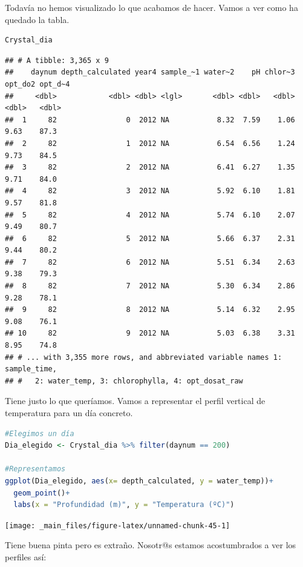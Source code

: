 \documentclass[
]{book}
\begin{document}
Todavía no hemos visualizado lo que acabamos de hacer. Vamos a ver como ha quedado la tabla.

\begin{lstlisting}[language=R]
Crystal_dia
\end{lstlisting}

\begin{lstlisting}
## # A tibble: 3,365 x 9
##    daynum depth_calculated year4 sample_~1 water~2    pH chlor~3 opt_do2 opt_d~4
##     <dbl>            <dbl> <dbl> <lgl>       <dbl> <dbl>   <dbl>   <dbl>   <dbl>
##  1     82                0  2012 NA           8.32  7.59    1.06    9.63    87.3
##  2     82                1  2012 NA           6.54  6.56    1.24    9.73    84.5
##  3     82                2  2012 NA           6.41  6.27    1.35    9.71    84.0
##  4     82                3  2012 NA           5.92  6.10    1.81    9.57    81.8
##  5     82                4  2012 NA           5.74  6.10    2.07    9.49    80.7
##  6     82                5  2012 NA           5.66  6.37    2.31    9.44    80.2
##  7     82                6  2012 NA           5.51  6.34    2.63    9.38    79.3
##  8     82                7  2012 NA           5.30  6.34    2.86    9.28    78.1
##  9     82                8  2012 NA           5.14  6.32    2.95    9.08    76.1
## 10     82                9  2012 NA           5.03  6.38    3.31    8.95    74.8
## # ... with 3,355 more rows, and abbreviated variable names 1: sample_time,
## #   2: water_temp, 3: chlorophylla, 4: opt_dosat_raw
\end{lstlisting}

Tiene justo lo que queríamos. Vamos a representar el perfil vertical de temperatura para un día concreto.

\begin{lstlisting}[language=R]
#Elegimos un día
Dia_elegido <- Crystal_dia %>% filter(daynum == 200)

#Representamos
ggplot(Dia_elegido, aes(x= depth_calculated, y = water_temp))+
  geom_point()+
  labs(x = "Profundidad (m)", y = "Temperatura (ºC)")
\end{lstlisting}

\texttt{[image: \_main\_files/figure-latex/unnamed-chunk-45-1]}

Tiene buena pinta pero es extraño. Nosotr@s estamos acostumbrados a ver los perfiles así:
\end{document}
